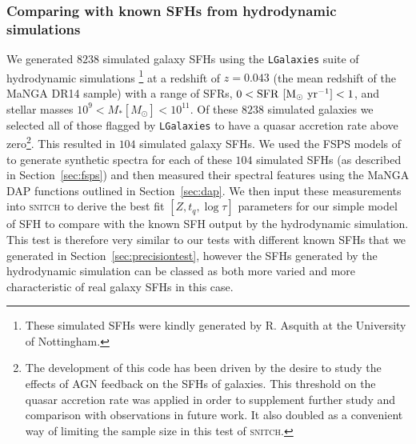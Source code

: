 \documentclass[useAMS,usenatbib]{mn2e}
\begin{document}



\subsubsection{Comparing with known SFHs from hydrodynamic simulations}\label{sec:lgalaxies}



We generated $8238$ simulated galaxy SFHs using the \texttt{LGalaxies} suite of hydrodynamic simulations \citep{henriques15}\footnote{These simulated SFHs were kindly generated by R. Asquith at the University of Nottingham.} at a redshift of $z=0.043$ (the mean redshift of the MaNGA DR14 sample) with a range of SFRs, $0 < \rm{SFR}~[M_{\odot}~\rm{yr}^{-1}] < 1$, and stellar masses $10^9 < M_{*} [M_{\odot}] < 10^{11}$. Of these $8238$ simulated galaxies we selected all of those flagged by \texttt{LGalaxies} to have a quasar accretion rate above zero\footnote{The development of this code has been driven by the desire to study the effects of AGN feedback on the SFHs of galaxies. This threshold on the quasar accretion rate was applied in order to supplement further study and comparison with observations in future work. It also doubled as a convenient way of limiting the sample size in this test of \textsc{snitch}.}. This resulted in $104$ simulated galaxy SFHs. We used the FSPS models of \cite{conroy10} to generate synthetic spectra for each of these $104$ simulated SFHs (as described in Section~\ref{sec:fsps}) and then measured their spectral features using the MaNGA DAP functions outlined in Section~\ref{sec:dap}. We then input these measurements into \textsc{snitch} to derive the best fit $[Z, t_q, \log \tau]$ parameters for our simple model of SFH to compare with the known SFH output by the hydrodynamic simulation. This test is therefore very similar to our tests with different known SFHs that we generated in Section~\ref{sec:precisiontest}, however the SFHs generated by the hydrodynamic simulation can be classed as both more varied and more characteristic of real galaxy SFHs in this case.
\end{document}
